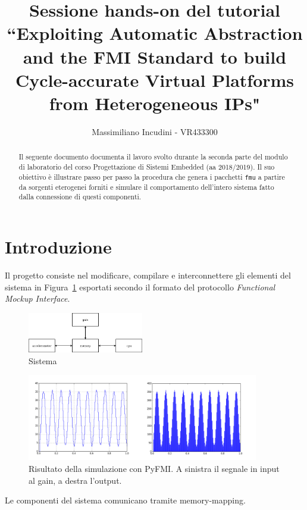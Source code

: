 \documentclass[]{IEEEtran}
\title{Sessione hands-on del tutorial {\huge ``Exploiting Automatic Abstraction and the FMI Standard to build Cycle-accurate Virtual Platforms from Heterogeneous IPs"}}
\author{Massimiliano Incudini - VR433300}
\newcommand{\code}[1]{\texttt{#1}}
\begin{document}
\maketitle

\begin{abstract}
    Il seguente documento documenta il lavoro svolto durante la seconda parte del modulo di laboratorio del corso Progettazione di Sistemi Embedded (aa 2018/2019). Il suo obiettivo è illustrare passo per passo la procedura che genera i pacchetti \code{fmu} a partire da sorgenti eterogenei forniti e simulare il comportamento dell'intero sistema fatto dalla connessione di questi componenti.
\end{abstract}

\section{Introduzione}

Il progetto consiste nel modificare, compilare e interconnettere gli elementi del sistema in Figura~\ref{fig:system} esportati secondo il formato del protocollo \emph{Functional Mockup Interface}. 

\begin{figure}[htbp]
    \centering
    \includegraphics[width=0.45\textwidth]{fmi_schemi/system.png}
    \caption{Sistema}
    \label{fig:system}
\end{figure}

\begin{figure}[h]
    \centering
    \includegraphics[width=0.9\textwidth]{fmi_schemi/images.png}
    \caption{Risultato della simulazione con PyFMI. A sinistra il segnale in input al gain, a destra l'output.}
    \label{fig:fmioutput}
\end{figure}

Le componenti del sistema comunicano tramite memory-mapping. 
\end{document}
